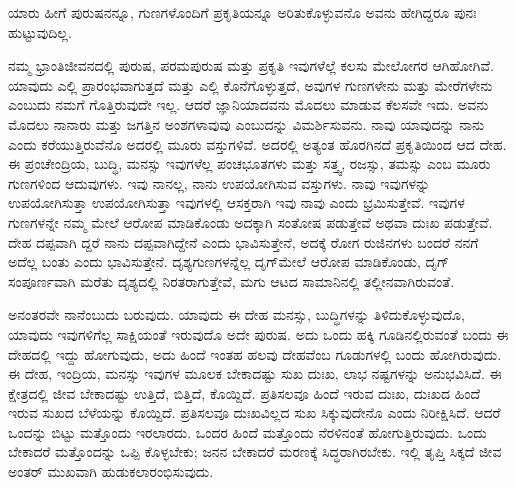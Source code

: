 \begin{artha}
ಯಾರು ಹೀಗೆ ಪುರುಷನನ್ನೂ, ಗುಣಗಳೊಂದಿಗೆ ಪ್ರಕೃತಿಯನ್ನೂ ಅರಿತುಕೊಳ್ಳುವನೊ ಅವನು ಹೇಗಿದ್ದರೂ ಪುನಃ ಹುಟ್ಟುವುದಿಲ್ಲ.
\end{artha}

ನಮ್ಮ ಭ್ರಾಂತಿಜೀವನದಲ್ಲಿ ಪುರುಷ, ಪರಮಪುರುಷ ಮತ್ತು ಪ್ರಕೃತಿ ಇವುಗಳೆಲ್ಲೆ ಕಲಸು ಮೇಲೋಗರ ಆಗಿಹೋಗಿವೆ. ಯಾವುದು ಎಲ್ಲಿ ಪ್ರಾರಂಭವಾಗುತ್ತದೆ ಮತ್ತು ಎಲ್ಲಿ ಕೊನೆಗೊಳ್ಳುತ್ತದೆ, ಅವುಗಳ ಗುಣಗಳೇನು ಮತ್ತು ಮೇರೆಗಳೇನು ಎಂಬುದು ನಮಗೆ ಗೊತ್ತಿರುವುದೇ ಇಲ್ಲ. ಆದರೆ ಜ್ಞಾನಿಯಾದವನು ಮೊದಲು ಮಾಡುವ ಕೆಲಸವೇ ಇದು. ಅವನು ಮೊದಲು ನಾನಾರು ಮತ್ತು ಜಗತ್ತಿನ ಅಂಶಗಳಾವುವು ಎಂಬುದನ್ನು ವಿಮರ್ಶಿಸುವನು. ನಾವು ಯಾವುದನ್ನು ನಾನು ಎಂದು ಕರೆಯುತ್ತಿರುವೆನೊ ಅದರಲ್ಲಿ ಮೂರು ವಸ್ತುಗಳಿವೆ. ಅದರಲ್ಲಿ ಅತ್ಯಂತ ಹೊರಗಿನದೆ ಪ್ರಕೃತಿಯಿಂದ ಆದ ದೇಹ. ಈ ಪ್ರಂಚೇಂದ್ರಿಯ, ಬುದ್ಧಿ, ಮನಸ್ಸು ಇವುಗಳೆಲ್ಲ ಪಂಚಭೂತಗಳು ಮತ್ತು ಸತ್ತ್ವ, ರಜಸ್ಸು, ತಮಸ್ಸು ಎಂಬ ಮೂರು ಗುಣಗಳಿಂದ ಆದುವುಗಳು. ಇವು ನಾನಲ್ಲ, ನಾನು ಉಪಯೋಗಿಸುವ ವಸ್ತುಗಳು. ನಾವು ಇವುಗಳನ್ನು ಉಪಯೋಗಿಸುತ್ತಾ ಉಪಯೋಗಿಸುತ್ತಾ ಇವುಗಳಲ್ಲಿ ಆಸಕ್ತರಾಗಿ ಇವು ನಾವು ಎಂದು ಭ್ರಮಿಸುತ್ತೇವೆ. ಇವುಗಳ ಗುಣಗಳನ್ನೇ ನಮ್ಮ ಮೇಲೆ ಆರೋಪ ಮಾಡಿಕೊಂಡು ಅದಕ್ಕಾಗಿ ಸಂತೋಷ ಪಡುತ್ತೇವೆ ಅಥವಾ ದುಃಖ ಪಡುತ್ತೇವೆ. ದೇಹ ದಪ್ಪವಾಗಿ ದ್ದರೆ ನಾನು ದಪ್ಪವಾಗಿದ್ದೇನೆ ಎಂದು ಭಾವಿಸುತ್ತೇನೆ, ಅದಕ್ಕೆ ರೋಗ ರುಜಿನಗಳು ಬಂದರೆ ನನಗೆ ಅದೆಲ್ಲ ಬಂತು ಎಂದು ಭಾವಿಸುತ್ತೇನೆ. ದೃಶ್ಯಗುಣಗಳನ್ನೆಲ್ಲ ದೃಗ್​ಮೇಲೆ ಆರೋಪ ಮಾಡಿಕೊಂಡು, ದೃಗ್ ಸಂಪೂರ್ಣವಾಗಿ ಮರೆತು ದೃಶ್ಯದಲ್ಲಿ ನಿರತರಾಗುತ್ತೇವೆ, ಮಗು ಆಟದ ಸಾಮಾನಿನಲ್ಲಿ ತಲ್ಲೀನವಾಗಿರುವಂತೆ.

ಅನಂತರವೇ ನಾನೆಂಬುದು ಬರುವುದು. ಯಾವುದು ಈ ದೇಹ ಮನಸ್ಸು, ಬುದ್ಧಿಗಳನ್ನು ತಿಳಿದುಕೊಳ್ಳುವುದೊ, ಯಾವುದು ಇವುಗಳಿಗೆಲ್ಲ ಸಾಕ್ಷಿಯಂತೆ ಇರುವುದೊ ಅದೇ ಪುರುಷ. ಅದು ಒಂದು ಹಕ್ಕಿ ಗೂಡಿನಲ್ಲಿರುವಂತೆ ಬಂದು ಈ ದೇಹದಲ್ಲಿ ಇದ್ದು ಹೋಗುವುದು, ಅದು ಹಿಂದೆ ಇಂತಹ ಹಲವು ದೇಹವೆಂಬ ಗೂಡುಗಳಲ್ಲಿ ಬಂದು ಹೋಗಿರುವುದು. ಈ ದೇಹ, ಇಂದ್ರಿಯ, ಮನಸ್ಸು ಇವುಗಳ ಮೂಲಕ ಬೇಕಾದಷ್ಟು ಸುಖ ದುಃಖ, ಲಾಭ ನಷ್ಟಗಳನ್ನು ಅನುಭವಿಸಿದೆ. ಈ ಕ್ಷೇತ್ರದಲ್ಲಿ ಜೀವ ಬೇಕಾದಷ್ಟು ಉತ್ತಿದೆ, ಬಿತ್ತಿದೆ, ಕೊಯ್ದಿದೆ. ಪ್ರತಿಸಲವೂ ಹಿಂದೆ ಇರುವ ದುಃಖ, ದುಃಖದ ಹಿಂದೆ ಇರುವ ಸುಖದ ಬೆಳೆಯನ್ನು ಕೊಯ್ದಿದೆ. ಪ್ರತಿಸಲವೂ ದುಃಖವಿಲ್ಲದ ಸುಖ ಸಿಕ್ಕುವುದೇನೊ ಎಂದು ನಿರೀಕ್ಷಿಸಿದೆ. ಆದರೆ ಒಂದನ್ನು ಬಿಟ್ಟು ಮತ್ತೊಂದು ಇರಲಾರದು. ಒಂದರ ಹಿಂದೆ ಮತ್ತೊಂದು ನೆರಳಿನಂತೆ ಹೋಗುತ್ತಿರುವುದು. ಒಂದು ಬೇಕಾದರೆ ಮತ್ತೊಂದನ್ನು ಒಪ್ಪಿ ಕೊಳ್ಳಬೇಕು; ಜನನ ಬೇಕಾದರೆ ಮರಣಕ್ಕೆ ಸಿದ್ಧರಾಗಿರಬೇಕು. ಇಲ್ಲಿ ತೃಪ್ತಿ ಸಿಕ್ಕದೆ ಜೀವ ಅಂತರ್ ಮುಖವಾಗಿ ಹುಡುಕಲಾರಂಭಿಸುವುದು.

